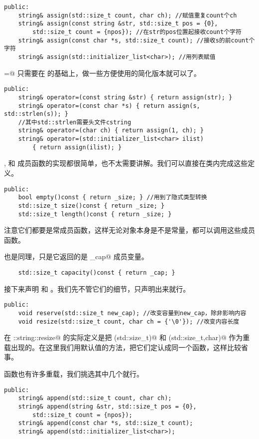 \begin{lstlisting}
public:
    string& assign(std::size_t count, char ch); //赋值重复count个ch
    string& assign(const string &str, std::size_t pos = {0},
        std::size_t count = {npos}); //在str的pos位置起接收count个字符
    string& assign(const char *s, std::size_t count); //接收s的前count个字符
    string& assign(std::initializer_list<char>); //用列表赋值
\end{lstlisting}
\lstinline@operator=@ 只需要在 \lstinline@assign@ 的基础上，做一些方便使用的简化版本就可以了。
\begin{lstlisting}
public:
    string& operator=(const string &str) { return assign(str); }
    string& operator=(const char *s) { return assign(s, std::strlen(s)); }
    //其中std::strlen需要头文件cstring
    string& operator=(char ch) { return assign(1, ch); }
    string& operator=(std::initializer_list<char> ilist)
        { return assign(ilist); }
\end{lstlisting}\par
\lstinline@empty@, \lstinline@size@ 和 \lstinline@length@ 成员函数的实现都很简单，也不太需要讲解。我们可以直接在类内完成这些定义。
\begin{lstlisting}
public:
    bool empty()const { return _size; } //用到了隐式类型转换
    std::size_t size()const { return _size; } 
    std::size_t length()const { return _size; }
\end{lstlisting}
注意它们都要是常成员函数，这样无论对象本身是不是常量，都可以调用这些成员函数。\par
\lstinline@capacity@ 也是同理，只是它返回的是 \lstinline@_cap@ 成员变量。
\begin{lstlisting}
    std::size_t capacity()const { return _cap; }
\end{lstlisting}\par
接下来声明 \lstinline@reserve@ 和 \lstinline@resize@。我们先不管它们的细节，只声明出来就行。
\begin{lstlisting}
public:
    void reserve(std::size_t new_cap); //改变容量到new_cap，除非影响内容
    void resize(std::size_t count, char ch = {'\0'}); //改变内容长度
\end{lstlisting}
在 \lstinline@std::string::resize@ 的实际定义是把 \lstinline@(std::size_t)@ 和 \lstinline@(std::size_t,char)@ 作为重载出现的。在这里我们用默认值的方法，把它们定认成同一个函数，这样比较省事。\par
\lstinline@append@ 函数也有许多重载，我们挑选其中几个就行。
\begin{lstlisting}
public:
    string& append(std::size_t count, char ch);
    string& append(string &str, std::size_t pos = {0},
        std::size_t count = {npos});
    string& append(const char *s, std::size_t count);
    string& append(std::initializer_list<char>);
\end{lstlisting}\par

